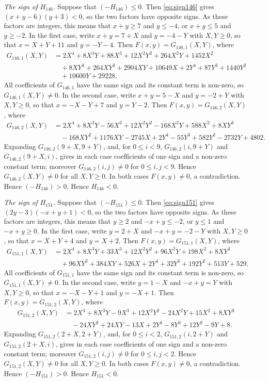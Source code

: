 \documentclass[11pt]{article}
\begin{document}
\emph{The sign of $H_{146}$.} Suppose that $(-H_{146})\leq0$. Then \eqref{eq:sign146} gives $(x+y-6)(y+3)<0$, so the two factors have opposite signs. As these factors are integers, this means that $x+y\geq7$ and $y\leq-4$, or $x+y\leq5$ and $y\geq-2$. In the first case, write $x+y=7+X$ and $y=-4-Y$ with $X,Y\geq0$, so that $x=X+Y+11$ and $y=-Y-4$. Then $F(x,y)=G_{146,1}(X,Y)$, where
\begin{align*}
G_{146,1}(X,Y)&=2X^{4}+8X^{3}Y+88X^{3}+12X^{2}Y^{2}+264X^{2}Y+1452X^{2}\\
&\quad+8XY^{3}+264XY^{2}+2904XY+10649X+2Y^{4}+87Y^{3}+1440Y^{2}\\
&\quad+10600Y+29228.
\end{align*}
All coefficients of $G_{146,1}$ have the same sign and its constant term is non-zero, so $G_{146,1}(X,Y)\neq0$. In the second case, write $x+y=5-X$ and $y=-2+Y$ with $X,Y\geq0$, so that $x=-X-Y+7$ and $y=Y-2$. Then $F(x,y)=G_{146,2}(X,Y)$, where
\begin{align*}
G_{146,2}(X,Y)&=2X^{4}+8X^{3}Y-56X^{3}+12X^{2}Y^{2}-168X^{2}Y+588X^{2}+8XY^{3}\\
&\quad-168XY^{2}+1176XY-2745X+2Y^{4}-55Y^{3}+582Y^{2}-2732Y+4802.
\end{align*}
Expanding $G_{146,2}(9+X,9+Y)$, and, for $0\leq i<9$, $G_{146,2}(i,9+Y)$ and $G_{146,2}(9+X,i)$, gives in each case coefficients of one sign and a non-zero constant term; moreover $G_{146,2}(i,j)\neq0$ for $0\leq i,j<9$. Hence $G_{146,2}(X,Y)\neq0$ for all $X,Y\geq0$. In both cases $F(x,y)\neq0$, a contradiction. Hence $(-H_{146})>0$. Hence $H_{146}<0$.

\emph{The sign of $H_{151}$.} Suppose that $(-H_{151})\leq0$. Then \eqref{eq:sign151} gives $(2y-3)(-x+y+1)<0$, so the two factors have opposite signs. As these factors are integers, this means that $y\geq2$ and $-x+y\leq-2$, or $y\leq1$ and $-x+y\geq0$. In the first case, write $y=2+X$ and $-x+y=-2-Y$ with $X,Y\geq0$, so that $x=X+Y+4$ and $y=X+2$. Then $F(x,y)=G_{151,1}(X,Y)$, where
\begin{align*}
G_{151,1}(X,Y)&=2X^{4}+8X^{3}Y+33X^{3}+12X^{2}Y^{2}+96X^{2}Y+198X^{2}+8XY^{3}\\
&\quad+96XY^{2}+384XY+526X+2Y^{4}+32Y^{3}+192Y^{2}+513Y+529.
\end{align*}
All coefficients of $G_{151,1}$ have the same sign and its constant term is non-zero, so $G_{151,1}(X,Y)\neq0$. In the second case, write $y=1-X$ and $-x+y=Y$ with $X,Y\geq0$, so that $x=-X-Y+1$ and $y=-X+1$. Then $F(x,y)=G_{151,2}(X,Y)$, where
\begin{align*}
G_{151,2}(X,Y)&=2X^{4}+8X^{3}Y-9X^{3}+12X^{2}Y^{2}-24X^{2}Y+15X^{2}+8XY^{3}\\
&\quad-24XY^{2}+24XY-13X+2Y^{4}-8Y^{3}+12Y^{2}-9Y+8.
\end{align*}
Expanding $G_{151,2}(2+X,2+Y)$, and, for $0\leq i<2$, $G_{151,2}(i,2+Y)$ and $G_{151,2}(2+X,i)$, gives in each case coefficients of one sign and a non-zero constant term; moreover $G_{151,2}(i,j)\neq0$ for $0\leq i,j<2$. Hence $G_{151,2}(X,Y)\neq0$ for all $X,Y\geq0$. In both cases $F(x,y)\neq0$, a contradiction. Hence $(-H_{151})>0$. Hence $H_{151}<0$.
\end{document}
